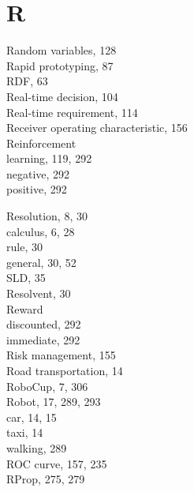 \documentclass[10pt]{article}
\begin{document}
\section*{R}
Random variables, 128\\
Rapid prototyping, 87\\
RDF, 63\\
Real-time decision, 104\\
Real-time requirement, 114\\
Receiver operating characteristic, 156\\
Reinforcement\\
learning, 119, 292\\
negative, 292\\
positive, 292

Resolution, 8, 30\\
calculus, 6, 28\\
rule, 30\\
general, 30, 52\\
SLD, 35\\
Resolvent, 30\\
Reward\\
discounted, 292\\
immediate, 292\\
Risk management, 155\\
Road transportation, 14\\
RoboCup, 7, 306\\
Robot, 17, 289, 293\\
car, 14, 15\\
taxi, 14\\
walking, 289\\
ROC curve, 157, 235\\
RProp, 275, 279
\end{document}
